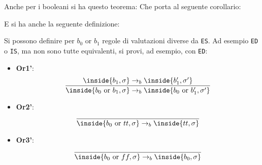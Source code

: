 Anche per i booleani si ha questo teorema:
Che porta al seguente corollario:

E si ha anche la seguente definizione:
\esempio{
    \[
        \lnot((3=v)\lor (3=4)) = \lnot(v=3)       
    \]
}

Si possono definire per $b_0$ or $b_1$ regole di valutazioni diverse da \texttt{ES}. Ad esempio \texttt{ED} o \texttt{IS}, ma non sono tutte equivalenti, si provi, ad esempio, con \texttt{ED}:

\begin{itemize}
    \item \textbf{Or1'}:
    \[\frac{\inside{b_1, \sigma}\to_b\inside{b_1',\sigma'}}{\inside{b_0 \text{ or }b_1, \sigma}\to_b\inside{b_0 \text{ or } b_1', \sigma'}}\]
    \item \textbf{Or2'}:
    \[
        \frac{}{\inside{b_0 \text{ or }tt, \sigma}\to_b \inside{tt, \sigma}}    
    \]
    \item \textbf{Or3'}:
    \[
        \frac{}{\inside{b_0 \text{ or }ff, \sigma}\to_b \inside{b_0, \sigma}}    
    \]
\end{itemize}
\esempio{
    $\gamma=\inside{}$
}
  
